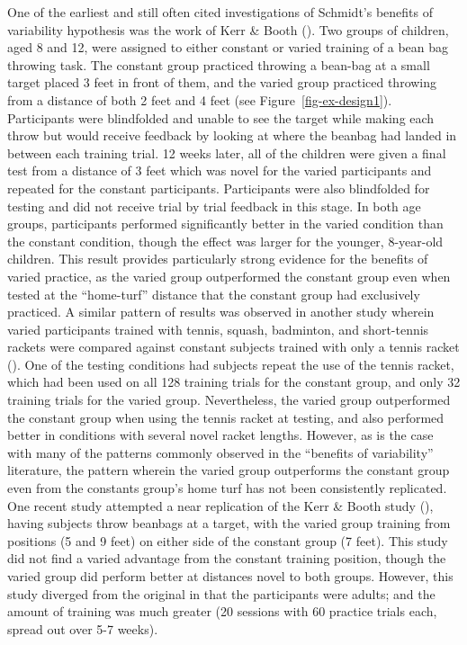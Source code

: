 \documentclass[
  11pt,
  letterpaper,
]{article}
\begin{document}
One of the earliest and still often cited investigations of Schmidt's
benefits of variability hypothesis was the work of Kerr \& Booth
(). Two groups of
children, aged 8 and 12, were assigned to either constant or varied
training of a bean bag throwing task. The constant group practiced
throwing a bean-bag at a small target placed 3 feet in front of them,
and the varied group practiced throwing from a distance of both 2 feet
and 4 feet (see Figure~\ref{fig-ex-design1}). Participants were
blindfolded and unable to see the target while making each throw but
would receive feedback by looking at where the beanbag had landed in
between each training trial. 12 weeks later, all of the children were
given a final test from a distance of 3 feet which was novel for the
varied participants and repeated for the constant participants.
Participants were also blindfolded for testing and did not receive trial
by trial feedback in this stage. In both age groups, participants
performed significantly better in the varied condition than the constant
condition, though the effect was larger for the younger, 8-year-old
children. This result provides particularly strong evidence for the
benefits of varied practice, as the varied group outperformed the
constant group even when tested at the ``home-turf'' distance that the
constant group had exclusively practiced. A similar pattern of results
was observed in another study wherein varied participants trained with
tennis, squash, badminton, and short-tennis rackets were compared
against constant subjects trained with only a tennis racket
(). One of the testing conditions had subjects repeat the use of the
tennis racket, which had been used on all 128 training trials for the
constant group, and only 32 training trials for the varied group.
Nevertheless, the varied group outperformed the constant group when
using the tennis racket at testing, and also performed better in
conditions with several novel racket lengths. However, as is the case
with many of the patterns commonly observed in the ``benefits of
variability'' literature, the pattern wherein the varied group
outperforms the constant group even from the constants group's home turf
has not been consistently replicated. One recent study attempted a near
replication of the Kerr \& Booth study
(),
having subjects throw beanbags at a target, with the varied group
training from positions (5 and 9 feet) on either side of the constant
group (7 feet). This study did not find a varied advantage from the
constant training position, though the varied group did perform better
at distances novel to both groups. However, this study diverged from the
original in that the participants were adults; and the amount of
training was much greater (20 sessions with 60 practice trials each,
spread out over 5-7 weeks).
\end{document}
